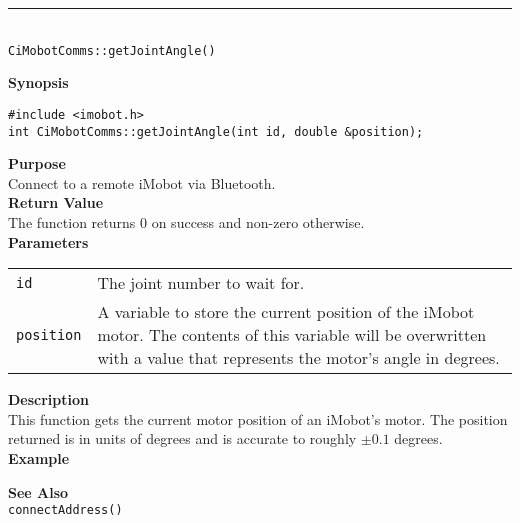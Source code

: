 \noindent
\vspace{5pt}
\rule{4.5in}{0.015in}\\
\noindent
{\LARGE \texttt{CiMobotComms::getJointAngle()}}\\
{}

\noindent
{\bf Synopsis}\\
\begin{verbatim}
#include <imobot.h>
int CiMobotComms::getJointAngle(int id, double &position);
\end{verbatim}

\noindent
{\bf Purpose}\\
Connect to a remote iMobot via Bluetooth.\\

\noindent
{\bf Return Value}\\
The function returns 0 on success and non-zero otherwise.\\

\noindent
{\bf Parameters}\\
\vspace{-0.1in}
\begin{description}
\item               
\begin{tabular}{p{10 mm}p{145 mm}}
\texttt{id} & The joint number to wait for. \\
\texttt{position} & A variable to store the current position of the iMobot
motor. The contents of this variable will be overwritten with a value that
represents the motor's angle in degrees.  \\
\end{tabular}
\end{description}

\noindent
{\bf Description}\\
This function gets the current motor position of an iMobot's motor. The
position returned is in units of degrees and is accurate to roughly $\pm0.1$
degrees. \\

\noindent
{\bf Example}\\
\noindent

\noindent
{\bf See Also}\\
\texttt{connectAddress()}

